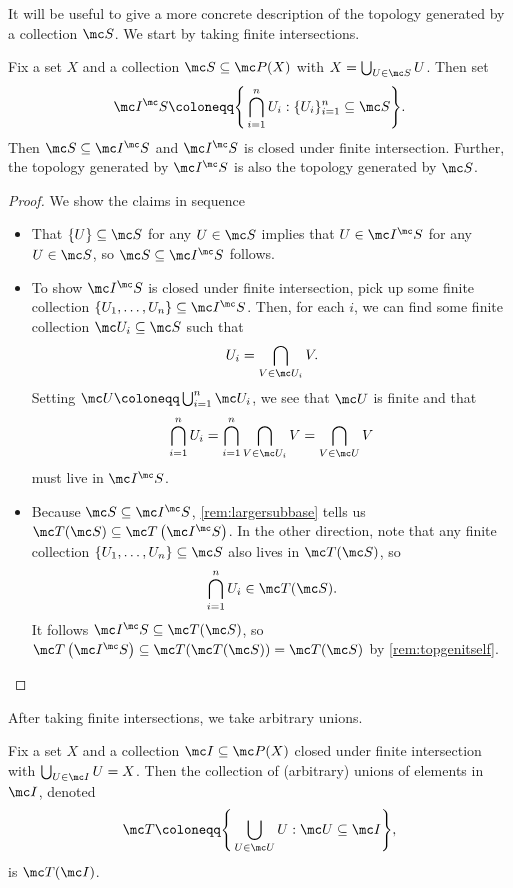 \documentclass[../notes.tex]{subfiles}
\begin{document}
It will be useful to give a more concrete description of the topology generated by a collection $\mc S$. We start by taking finite intersections.
\begin{lemma} \label{lem:finintersect}
	Fix a set $X$ and a collection $\mc S\subseteq\mc P(X)$ with $X=\bigcup_{U\in\mc S}U$. Then set
	\[\mc I^\mc S\coloneqq\Bigg\{\bigcap_{i=1}^nU_i:\{U_i\}_{i=1}^n\subseteq\mc S\Bigg\}.\]
	Then $\mc S\subseteq\mc I^\mc S$ and $\mc I^\mc S$ is closed under finite intersection. Further, the topology generated by $\mc I^\mc S$ is also the topology generated by $\mc S$.
\end{lemma}
\begin{proof}
	We show the claims in sequence
	\begin{itemize}
		\item That $\{U\}\subseteq\mc S$ for any $U\in\mc S$ implies that $U\in\mc I^\mc S$ for any $U\in\mc S$, so $\mc S\subseteq\mc I^\mc S$ follows.
		\item To show $\mc I^\mc S$ is closed under finite intersection, pick up some finite collection $\{U_1,\ldots,U_n\}\subseteq\mc I^\mc S$. Then, for each $i$, we can find some finite collection $\mc U_i\subseteq\mc S$ such that
		\[U_i=\bigcap_{V\in\mc U_i}V.\]
		Setting $\mc U\coloneqq\bigcup_{i=1}^n\mc U_i$, we see that $\mc U$ is finite and that
		\[\bigcap_{i=1}^nU_i=\bigcap_{i=1}^n\bigcap_{V\in\mc U_i}V=\bigcap_{V\in\mc U}V\]
		must live in $\mc I^\mc S$.
		\item Because $\mc S\subseteq\mc I^\mc S$, \autoref{rem:largersubbase} tells us $\mc T(\mc S)\subseteq\mc T\left(\mc I^\mc S\right)$. In the other direction, note that any finite collection $\{U_1,\ldots,U_n\}\subseteq\mc S$ also lives in $\mc T(\mc S)$, so
		\[\bigcap_{i=1}^nU_i\in\mc T(\mc S).\]
		It follows $\mc I^\mc S\subseteq\mc T(\mc S)$, so $\mc T\left(\mc I^\mc S\right)\subseteq\mc T(\mc T(\mc S))=\mc T(\mc S)$ by \autoref{rem:topgenitself}.
		\qedhere
	\end{itemize}
\end{proof}
After taking finite intersections, we take arbitrary unions.
\begin{lemma} \label{lem:takearbunion}
	Fix a set $X$ and a collection $\mc I\subseteq\mc P(X)$ closed under finite intersection with $\bigcup_{U\in\mc I}U=X$. Then the collection of (arbitrary) unions of elements in $\mc I$, denoted
	\[\mc T\coloneqq\Bigg\{\bigcup_{U\in\mc U}U:\mc U\subseteq\mc I\Bigg\},\]
	is $\mc T(\mc I)$.
\end{lemma}
\end{document}
